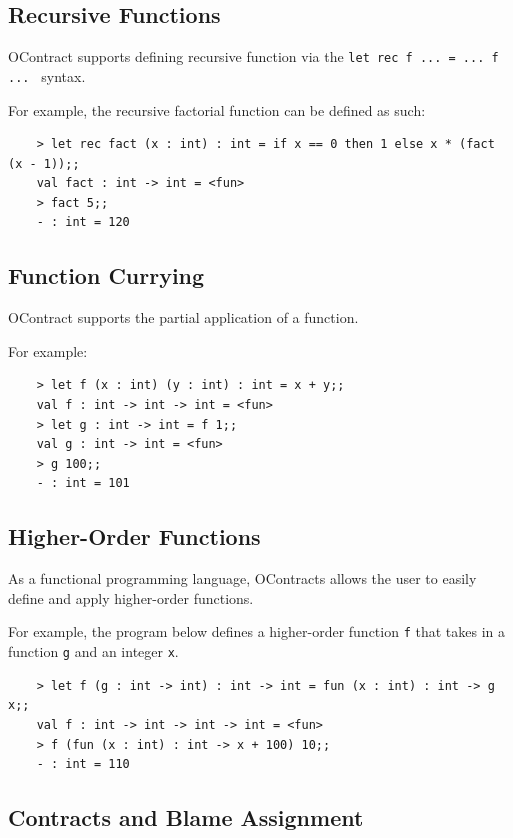 \documentclass[a4paper]{article}
\begin{document}
\subsection{Recursive Functions}

OContract supports defining recursive function via the \texttt{let rec f ... = ... f ... } syntax.

For example, the recursive factorial function can be defined as such:

\begin{verbatim}
    > let rec fact (x : int) : int = if x == 0 then 1 else x * (fact (x - 1));;
    val fact : int -> int = <fun>
    > fact 5;;
    - : int = 120
\end{verbatim}

\subsection{Function Currying}

OContract supports the partial application of a function.

For example:

\begin{verbatim}
    > let f (x : int) (y : int) : int = x + y;;
    val f : int -> int -> int = <fun>
    > let g : int -> int = f 1;;
    val g : int -> int = <fun>
    > g 100;;
    - : int = 101
\end{verbatim}

\subsection{Higher-Order Functions}

As a functional programming language, OContracts allows the user to easily define and apply higher-order functions.

For example, the program below defines a higher-order function \texttt{f} that takes in a function \texttt{g} and an integer \texttt{x}.

\begin{verbatim}
    > let f (g : int -> int) : int -> int = fun (x : int) : int -> g x;;
    val f : int -> int -> int -> int = <fun>
    > f (fun (x : int) : int -> x + 100) 10;;
    - : int = 110
\end{verbatim}

\subsection{Contracts and Blame Assignment}
\end{document}
